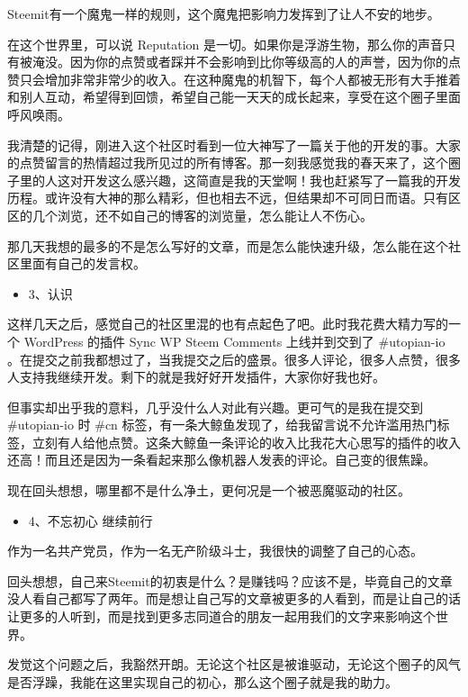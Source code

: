 \documentclass[]{ctexbook}
\providecommand{\tightlist}{%
  \setlength{\itemsep}{0pt}\setlength{\parskip}{0pt}}
\begin{document}
Steemit有一个魔鬼一样的规则，这个魔鬼把影响力发挥到了让人不安的地步。

在这个世界里，可以说 Reputation 是一切。如果你是浮游生物，那么你的声音只有被淹没。因为你的点赞或者踩并不会影响到比你等级高的人的声誉，因为你的点赞只会增加非常非常少的收入。在这种魔鬼的机智下，每个人都被无形有大手推着和别人互动，希望得到回馈，希望自己能一天天的成长起来，享受在这个圈子里面呼风唤雨。

我清楚的记得，刚进入这个社区时看到一位大神写了一篇关于他的开发的事。大家的点赞留言的热情超过我所见过的所有博客。那一刻我感觉我的春天来了，这个圈子里的人这对开发这么感兴趣，这简直是我的天堂啊！我也赶紧写了一篇我的开发历程。或许没有大神的那么精彩，但也相去不远，但结果却不可同日而语。只有区区的几个浏览，还不如自己的博客的浏览量，怎么能让人不伤心。

那几天我想的最多的不是怎么写好的文章，而是怎么能快速升级，怎么能在这个社区里面有自己的发言权。

\begin{itemize}
\tightlist
\item
  3、认识
\end{itemize}

这样几天之后，感觉自己的社区里混的也有点起色了吧。此时我花费大精力写的一个 WordPress 的插件 Sync WP Steem Comments 上线并到交到了 \#utopian-io 。在提交之前我都想过了，当我提交之后的盛景。很多人评论，很多人点赞，很多人支持我继续开发。剩下的就是我好好开发插件，大家你好我也好。

但事实却出乎我的意料，几乎没什么人对此有兴趣。更可气的是我在提交到 \#utopian-io 时 \#cn 标签，有一条大鲸鱼发现了，给我留言说不允许滥用热门标签，立刻有人给他点赞。这条大鲸鱼一条评论的收入比我花大心思写的插件的收入还高！而且还是因为一条看起来那么像机器人发表的评论。自己变的很焦躁。

现在回头想想，哪里都不是什么净土，更何况是一个被恶魔驱动的社区。

\begin{itemize}
\tightlist
\item
  4、不忘初心 继续前行
\end{itemize}

作为一名共产党员，作为一名无产阶级斗士，我很快的调整了自己的心态。

回头想想，自己来Steemit的初衷是什么？是赚钱吗？应该不是，毕竟自己的文章没人看自己都写了两年。而是想让自己写的文章被更多的人看到，而是让自己的话让更多的人听到，而是找到更多志同道合的朋友一起用我们的文字来影响这个世界。

发觉这个问题之后，我豁然开朗。无论这个社区是被谁驱动，无论这个圈子的风气是否浮躁，我能在这里实现自己的初心，那么这个圈子就是我的助力。
\end{document}
